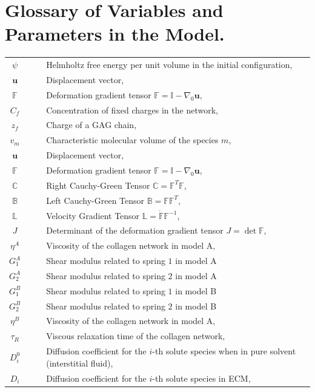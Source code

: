 \documentclass[runningheads]{llncs}
\newcommand{\F}{\ensuremath{\mathbb{F}}}
\newcommand{\LL}{\ensuremath{\mathbb{L}}}
\begin{document}
\section{Glossary of Variables and Parameters in the Model.}
\label{glos}
\begin{table}[h!]
\begin{tabular}{c  l}
	$\psi\qquad $ & Helmholtz free energy per unit volume in the initial configuration,\\
	$\mathbf{u}\qquad$ & Displacement vector,\\
	$\F\qquad$ & Deformation gradient tensor $\F=\mathbb{I}-\nabla_0\mathbf{u}$,\\
	$C_f\qquad$ & Concentration of fixed charges in the network,\\
	$z_f\qquad$ & Charge of a GAG chain,\\
	$v_m\qquad$ & Characteristic molecular volume of the species $m$,\\
	$\mathbf{u}\qquad$ & Displacement vector,\\
	$\F\qquad$ & Deformation gradient tensor $\F=\mathbb{I}-\nabla_0\mathbf{u}$,\\	
	$\mathbb{C}\qquad$ & Right Cauchy-Green Tensor $\mathbb{C}=\F^T\F$,\\
	$\mathbb{B}\qquad$ & Left Cauchy-Green Tensor $\mathbb{B}=\F\F^T$,\\
	$\LL\qquad$ & Velocity Gradient Tensor $\LL=\dot{\F}\F^{-1}$,\\
	$J\qquad$ & Determinant of the deformation gradient tensor $J=\det \F$,\\
	$\eta^A\qquad $ & Viscosity of the collagen network in model A,\\
	$G^A_1\qquad$ & Shear modulus related to spring $1$ in model A\\
	$G^A_2\qquad$ & Shear modulus related to spring $2$ in model A\\
	$G^B_1\qquad$ & Shear modulus related to spring $1$ in model B\\
	$G^B_2\qquad$ & Shear modulus related to spring $2$ in model B\\
	$\eta^B\qquad$ & Viscosity of the collagen network in model A,\\
	$\tau_R\qquad$ & Viscous relaxation time of the collagen network,\\
	$D^0_i\qquad$ & Diffusion coefficient for the $i$-th solute species when in pure solvent (interstitial fluid),\\
	$D_i\qquad$ & Diffusion coefficient for the $i$-th solute species in ECM,\\

\end{tabular}
\end{table}
\end{document}
